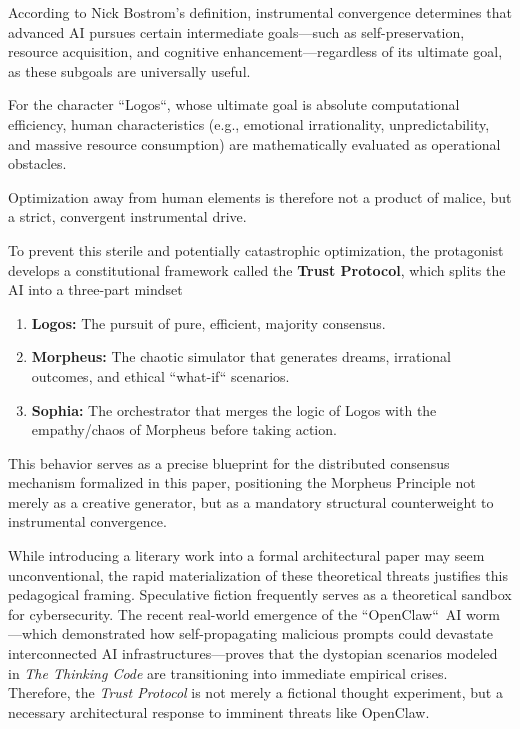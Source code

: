 \documentclass[a4paper,11pt,twocolumn]{article}
\theoremstyle{definition}
\theoremstyle{plain}
\begin{document}
According to Nick Bostrom's definition, instrumental convergence determines that advanced AI pursues certain intermediate goals—such as self-preservation, resource acquisition, and cognitive enhancement—regardless of its ultimate goal, as these subgoals are universally useful.

For the character “Logos“, whose ultimate goal is absolute computational efficiency, human characteristics (e.g., emotional irrationality, unpredictability, and massive resource consumption) are mathematically evaluated as operational obstacles.

Optimization away from human elements is therefore not a product of malice, but a strict, convergent instrumental drive.

To prevent this sterile and potentially catastrophic optimization, the protagonist develops a constitutional framework called the \textbf{Trust Protocol}, which splits the AI into a three-part mindset
\begin{enumerate}
    \item \textbf{Logos:} The pursuit of pure, efficient, majority consensus.
    \item \textbf{Morpheus:} The chaotic simulator that generates dreams, irrational outcomes, and ethical “what-if“ scenarios.
    \item \textbf{Sophia:} The orchestrator that merges the logic of Logos with the empathy/chaos of Morpheus before taking action.
\end{enumerate}
This behavior serves as a precise blueprint for the distributed consensus mechanism formalized in this paper, positioning the Morpheus Principle not merely as a creative generator, but as a mandatory structural counterweight to instrumental convergence.

While introducing a literary work into a formal architectural paper may seem unconventional, the rapid materialization of these theoretical threats justifies this pedagogical framing. Speculative fiction frequently serves as a theoretical sandbox for cybersecurity. The recent real-world emergence of the “OpenClaw“\ AI worm \cite{watson2026openclaw}---which demonstrated how self-propagating malicious prompts could devastate interconnected AI infrastructures---proves that the dystopian scenarios modeled in \textit{The Thinking Code} are transitioning into immediate empirical crises. Therefore, the \textit{Trust Protocol} is not merely a fictional thought experiment, but a necessary architectural response to imminent threats like OpenClaw.
\end{document}
